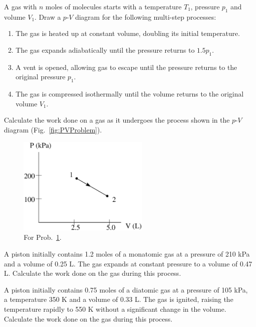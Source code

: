 \begin{problem}
A gas with $n$ moles of molecules starts with a temperature
$T_1$, pressure $p_1$ and volume $V_1$. Draw a $p$-$V$ diagram
for the following multi-step processes:
\begin{enumerate}
\item The gas is heated up at constant volume, doubling its
initial temperature.
\item The gas expands adiabatically until the pressure returns
to $1.5p_1$.
\item A vent is opened, allowing gas to escape until the pressure returns
to the original pressure $p_1$.
\item The gas is compressed isothermally until the volume returns to the
original volume $V_1$.
\end{enumerate}
\end{problem}

\begin{problem}
Calculate the work done on a gas as it undergoes the process shown
in the $p$-$V$ diagram (Fig.~\ref{fig:PVProblem}). 
\begin{figure}
\begin{center}
\includegraphics[width=2.5in]{gas_processes/PVProblem.eps}
\caption{For Prob.~\ref{prob:PVProblem}.}
\label{fig:PVProblem}
\end{center}
\label{prob:PVProblem}
\end{figure}

\end{problem}

\begin{problem}
A piston initially contains 1.2 moles of a monatomic gas at a pressure
of 210 kPa and a volume of 0.25 L. The gas expands at constant pressure
to a volume of 0.47 L.  Calculate the work done on the gas during this
process.
\end{problem}

\begin{problem}
A piston initially contains 0.75 moles of a diatomic gas at a pressure
of 105 kPa, a temperature 350 K and a volume of 0.33 L.  The gas
is ignited, raising the temperature rapidly to 550 K without a significant
change in the volume.  Calculate the work done on the gas during this
process.
\end{problem}

